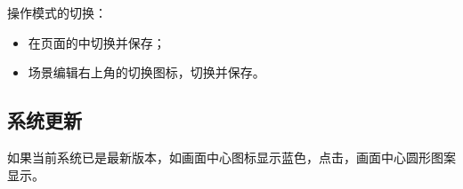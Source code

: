 操作模式的切换：
\begin{itemize}
	\item 在页面的中切换并保存；
	\item 场景编辑右上角的切换图标，切换并保存。
\end{itemize}

\subsection{系统更新}
如果当前系统已是最新版本，如画面中心图标显示蓝色，点击，画面中心圆形图案显示。

